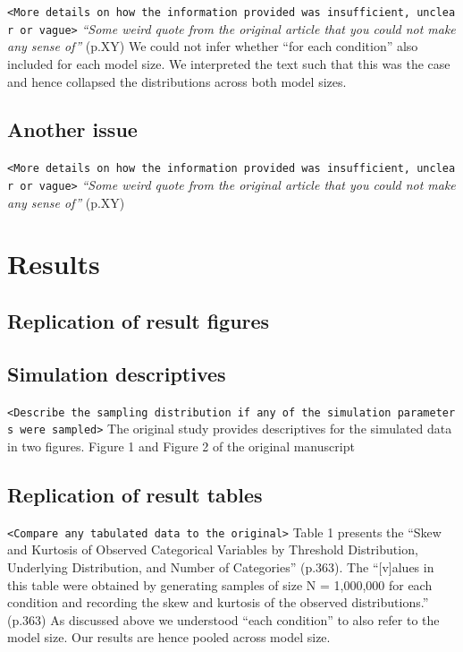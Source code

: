 \documentclass[10,a4paperpaper,]{article}
\begin{document}
\texttt{\textless{}More\ details\ on\ how\ the\ information\ provided\ was\ insufficient,\ unclear\ or\ vague\textgreater{}}
\emph{``Some weird quote from the original article that you could not
make any sense of''} (p.XY) We could not infer whether ``for each
condition'' also included for each model size. We interpreted the text
such that this was the case and hence collapsed the distributions across
both model sizes.

\subsection{Another issue}

\texttt{\textless{}More\ details\ on\ how\ the\ information\ provided\ was\ insufficient,\ unclear\ or\ vague\textgreater{}}
\emph{``Some weird quote from the original article that you could not
make any sense of''} (p.XY)

\section{Results}

\subsection{Replication of result figures}
\subsection{Simulation descriptives}

\texttt{\textless{}Describe\ the\ sampling\ distribution\ if\ any\ of\ the\ simulation\ parameters\ were\ sampled\textgreater{}}
The original study provides descriptives for the simulated data in two
figures. Figure 1 and Figure 2 of the original manuscript

\subsection{Replication of result tables}

\texttt{\textless{}Compare\ any\ tabulated\ data\ to\ the\ original\textgreater{}}
Table 1 presents the ``Skew and Kurtosis of Observed Categorical
Variables by Threshold Distribution, Underlying Distribution, and Number
of Categories'' (p.363). The ``{[}v{]}alues in this table were obtained
by generating samples of size N = 1,000,000 for each condition and
recording the skew and kurtosis of the observed distributions.'' (p.363)
As discussed above we understood ``each condition'' to also refer to the
model size. Our results are hence pooled across model size.
\end{document}
